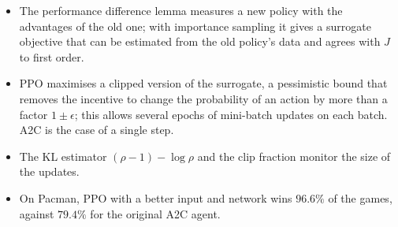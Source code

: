 \begin{itemize}[nosep]
  \item The performance difference lemma measures a new policy with the
    advantages of the old one; with importance sampling it gives a
    surrogate objective that can be estimated from the old policy's data
    and agrees with $J$ to first order.
  \item PPO maximises a clipped version of the surrogate, a pessimistic
    bound that removes the incentive to change the probability of an
    action by more than a factor $1 \pm \epsilon$; this allows several
    epochs of mini-batch updates on each batch. A2C is the case of a single
    step.
  \item The KL estimator $(\rho - 1) - \log \rho$ and the clip fraction
    monitor the size of the updates.
  \item On Pacman, PPO with a better input and network wins $96.6\%$ of the
    games, against $79.4\%$ for the original A2C agent.
\end{itemize}
